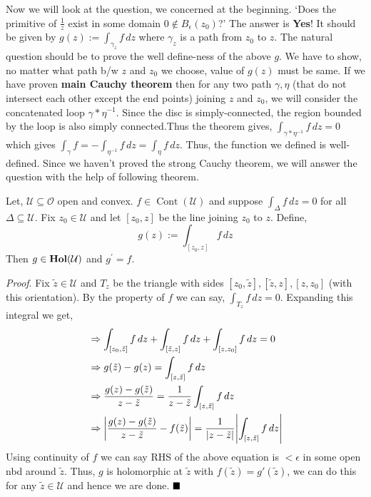\documentclass[../ComplexAnalysis_Notes.tex]{subfiles}
\begin{document}
\vspace*{0.1cm}

\noindent Now we will look at the question, we concerned at the beginning. `Does the primitive of $\frac{1}{z}$ exist in some domain $0 \notin B_{\epsilon}(z_0)$?' The answer is \textbf{Yes}! It should be given by $g(z) := \int_{\gamma_z} f\, dz$ where $\gamma_z$ is a path from $z_0$ to $z$.  The natural question should be to prove the well define-ness of the above $g$. We have to show, no matter what path b/w $z$ and $z_0$ we choose, value of $g(z)$ must be same. If we have proven \textbf{main Cauchy theorem} then for any two path $\gamma,\eta$ (that do not intersect each other except the end points) joining $z$ and $z_0$, we will consider the concatenated loop $\gamma \ast \eta^{-1}$. Since the disc is simply-connected, the region bounded by the loop is also simply connected.Thus the theorem gives, $\int_{\gamma \ast \eta^{-1}} f \, dz =0$ which gives $\int_{\gamma} f = - \int_{\eta^{-1}} f\, dz = \int_{\eta} f\, dz$. Thus, the function we defined is well-defined. Since we haven't proved the strong Cauchy theorem, we will answer the question with the help of following theorem. 

\begin{Thm}{}{}\label{thm:4.2}
    \hspace*{0.1cm} Let, $\mathcal{U} \subseteq \mathcal{O}$ open and convex.  $f \in \operatorname{Cont}(\mathcal{U})$ and suppose $\int_{\Delta} f \, dz =0$ for all $\Delta \subseteq \mathcal{U}$. Fix $z_0 \in \mathcal{U}$ and let $[z_0,z]$ be the line joining $z_0$ to $z$.  Define, \[g(z):= \int_{[z_0,z]}f\, dz \]
    Then $g \in \operatorname{\mathbf{Hol}} (\mathcal{U})$ and $g^{\prime} =f$.
\end{Thm}

\noindent \textit{Proof}. Fix $\tilde{z} \in \mathcal{U}$ and $T_{z}$ be the triangle with sides $[z_0,\tilde{z}],[\tilde{z},z], [z,z_0]$ (with this orientation). By the property of $f$ we can say, $\int_{T_z} f\, dz =0$. Expanding this integral we get, \begin{align*}
    & \Rightarrow \int_{[z_0,\tilde{z}]} f \, dz + \int_{[\tilde{z},z]} f \, dz + \int_{[z,z_0]} f \, dz =0 \\
    & \Rightarrow g(\tilde{z}) -g(z) =  \int_{[z,\tilde{z}]} f \, dz  \\
    &\Rightarrow \frac{g(z)-g(\tilde{z})}{z-\tilde{z}} = \frac{1}{z-\tilde{z}}  \int_{[z,\tilde{z}]} f \, dz  \\
    &\Rightarrow \abs{\frac{g(z)-g(\tilde{z})}{z-\tilde{z}}-f(\tilde{z})} =   \frac{1}{\abs{z-\tilde{z}}}\abs{\int_{[z,\tilde{z}]} f \, dz} 
\end{align*}
Using continuity of $f$ we can say RHS of the above equation is $<\epsilon$ in some open nbd around $\tilde{z}$. Thus, $g$ is holomorphic at $\tilde{z}$ with $f(\tilde{z})=g'(\tilde{z})$, we can do this for any $\tilde{z} \in \mathcal{U}$ and hence we are done. $\hfill \blacksquare$
\end{document}
